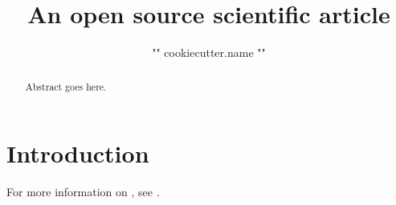 \documentclass[twocolumn]{aastex631}
\begin{document}
\title{An open source scientific article}

\author{{ "{" }}{{ cookiecutter.name }}{{ "}" }}

\begin{abstract}
    Abstract goes here.
\end{abstract}

\section{Introduction}
\label{sec:intro}

For more information on \showyourwork, see \citet{Luger2022}.


\end{document}

